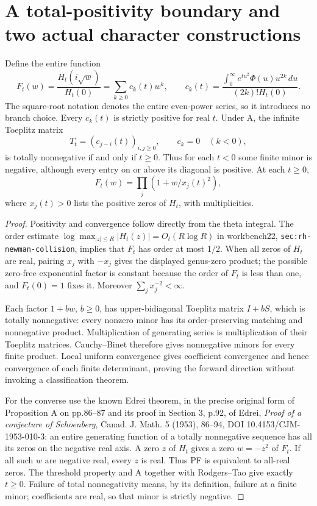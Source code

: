 \section{A total-positivity boundary and two actual character constructions}

\begin{theorem}
Define the entire function
\[
 F_t(w)=\frac{H_t(i\sqrt w)}{H_t(0)}=\sum_{k\ge0}c_k(t)w^k,
 \qquad
 c_k(t)=\frac{\int_0^\infty e^{tu^2}\Phi(u)u^{2k}\,du}
 {(2k)!H_t(0)}.
\]
The square-root notation denotes the entire even-power series, so it
introduces no branch choice. Every $c_k(t)$ is strictly positive for
real $t$. Under A, the infinite Toeplitz matrix
\[
 T_t=(c_{j-i}(t))_{i,j\ge0},\qquad c_k=0\quad(k<0),
\]
is totally nonnegative if and only if $t\ge0$. Thus for each $t<0$
some finite minor is negative, although every entry on or above its
diagonal is positive. At each $t\ge0$,
\[
 F_t(w)=\prod_j(1+w/x_j(t)^2),
\]
where $x_j(t)>0$ lists the positive zeros of $H_t$, with multiplicities.
\end{theorem}
\begin{proof}
Positivity and convergence follow directly from the theta integral.
The order estimate $\log\max_{|z|\le R}|H_t(z)|=O_t(R\log R)$
in workbench22, \texttt{sec:rh-newman-collision}, implies that $F_t$
has order at most $1/2$. When all zeros of $H_t$ are real, pairing
$x_j$ with $-x_j$ gives the displayed genus-zero product; the possible
zero-free exponential factor is constant because the order of $F_t$
is less than one, and $F_t(0)=1$ fixes it. Moreover
$\sum_jx_j^{-2}<\infty$.

Each factor $1+bw$, $b\ge0$, has upper-bidiagonal Toeplitz matrix
$I+bS$, which is totally nonnegative: every nonzero minor has its
order-preserving matching and nonnegative product. Multiplication of
generating series is multiplication of their Toeplitz matrices.
Cauchy--Binet therefore gives nonnegative minors for every finite
product. Local uniform convergence gives coefficient convergence and
hence convergence of each finite determinant, proving the forward
direction without invoking a classification theorem.

For the converse use the known Edrei theorem, in the precise original
form of Proposition A on pp.86--87 and its proof in Section 3, p.92,
of Edrei, \emph{Proof of a conjecture of Schoenberg}, Canad. J. Math.
5 (1953), 86--94, DOI 10.4153/CJM-1953-010-3: an entire generating
function of a totally nonnegative sequence has all its zeros on the
negative real axis. A zero $z$ of $H_t$ gives a zero $w=-z^2$ of
$F_t$. If all such $w$ are negative real, every $z$ is real. Thus PF
is equivalent to all-real zeros. The threshold property and A together
with Rodgers--Tao give exactly $t\ge0$. Failure of total nonnegativity
means, by its definition, failure at a finite minor; coefficients are
real, so that minor is strictly negative.
\end{proof}

